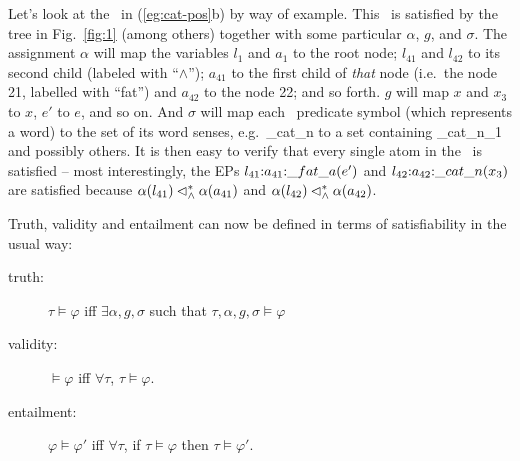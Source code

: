 Let's look at the \rmrs\ in (\ref{eg:cat-pos}b) by way of example.
This \rmrs\ is satisfied
by the tree in Fig.~\ref{fig:1} (among others) together with some
particular $\alpha$, $g$, and $\sigma$.  The assignment $\alpha$ will
map the variables $l_1$ and $a_1$ to the root node; $l_{41}$ and
$l_{42}$ to its second child (labeled with ``$\wedge$''); $a_{41}$ to
the first child of \emph{that} node (i.e.\ the node 21, labelled with
``fat'') and $a_{42}$ to the node 22; and so forth.  $g$ will map $x$
and $x_3$ to $x$, $e'$ to $e$, and so on.  And $\sigma$ will map each
\rmrs\ predicate symbol (which represents a word) to the set of its
word senses, e.g.\ \_cat\_n to a set containing \_cat\_n\_1 and
possibly others.  It is then easy to verify that every single atom in
the \rmrs\ is satisfied -- most interestingly, the EPs
$l_{41} {:} a_{41} {:} \_fat\_a(e')$ and
$l_{42} {:} a_{42} {:} \_cat\_n(x_3)$ are satisfied because
$\alpha(l_{41}) \lhd^*_\wedge \alpha(a_{41})$ and $\alpha(l_{42})
\lhd^*_\wedge \alpha(a_{42})$.

Truth, validity and entailment can now be defined in terms of
satisfiability in the usual way:
\begin{definition}\label{defn:entailment}
\begin{description}
\item   [truth:] $\tau\models \varphi$ iff $\exists \alpha,g,\sigma$  such
  that $\tau,\alpha,g,\sigma\models \varphi$
\item   [validity:] $\models \varphi$ iff $\forall \tau$, $\tau\models \varphi$.
\item   [entailment:] $\varphi\models \varphi'$ iff $\forall \tau$, if
  $\tau\models \varphi$ then $\tau\models \varphi'$.
\end{description}
\end{definition}



